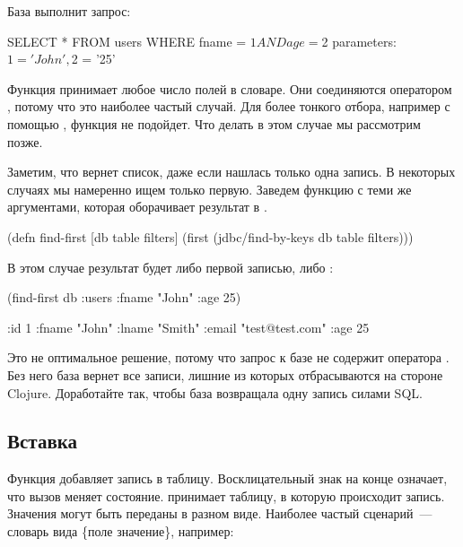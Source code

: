 База выполнит запрос:

\begin{english}
  \begin{sql}
SELECT * FROM users WHERE fname = $1 AND age = $2
parameters: $1 = 'John', $2 = '25'
  \end{sql}
\end{english}

Функция принимает любое число полей в словаре. Они соединяются оператором , потому что это наиболее частый случай. Для более тонкого отбора, например с помощью , функция не подойдет. Что делать в этом случае мы рассмотрим позже.

Заметим, что  вернет список, даже если нашлась только одна запись. В некоторых случаях мы намеренно ищем только первую. Заведем функцию  с теми же аргументами, которая оборачивает результат в .

\begin{english}
  \begin{clojure}
(defn find-first [db table filters]
  (first (jdbc/find-by-keys db table filters)))
  \end{clojure}
\end{english}

В этом случае результат будет либо первой записью, либо :

\begin{english}
  \begin{clojure}
(find-first db :users {:fname "John" :age 25})

{:id 1 :fname "John" :lname "Smith"
 :email "test@test.com" :age 25}
  \end{clojure}
\end{english}

Это не оптимальное решение, потому что запрос к базе не содержит оператора . Без него база вернет все записи, лишние из которых отбрасываются на стороне Clojure. Доработайте  так, чтобы база возвращала одну запись силами SQL.

\subsection{Вставка}

Функция  добавляет запись в таблицу. Восклицательный знак на конце означает, что вызов меняет состояние.  принимает таблицу, в которую происходит запись. Значения могут быть переданы в разном виде. Наиболее частый сценарий~--- словарь вида \{поле \arr значение\}, например:

